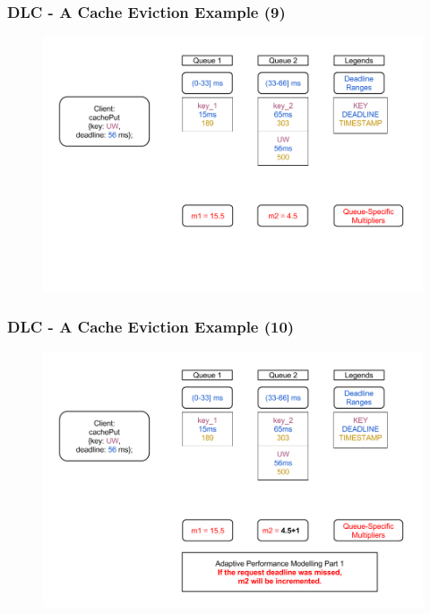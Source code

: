 \documentclass{beamer}
\begin{document}
\begin{frame}
  \frametitle{DLC - A Cache Eviction Example (9)}
  \begin{figure}
    \begin{center}
      \centerline{\includegraphics[scale=0.33]{img/DLC_V5_9.png}}
    \end{center}
  \end{figure}
\end{frame}

\begin{frame}
  \frametitle{DLC - A Cache Eviction Example (10)}
  \begin{figure}
    \begin{center}
      \centerline{\includegraphics[scale=0.33]{img/DLC_V5_10.png}}
    \end{center}
  \end{figure}
\end{frame}
\end{document}

